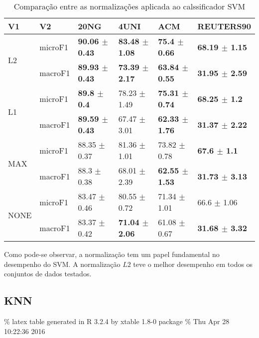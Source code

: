\documentclass[]{article}
\begin{document}
\begin{table}[ht]
\centering
\begin{tabular}{llllll}
  \hline
V1 & V2 & 20NG & 4UNI & ACM & REUTERS90 \\ 
  \cline{3-6} \hline
\multirow{2}{*}{L2} & microF1 & \bf{90.06 $\pm$  0.43} & \bf{83.48 $\pm$  1.08} & \bf{75.4 $\pm$  0.66} & \bf{68.19 $\pm$  1.15} \\ 
   & macroF1 & \bf{89.93 $\pm$  0.43} & \bf{73.39 $\pm$  2.17} & \bf{63.84 $\pm$  0.55} & \bf{31.95 $\pm$  2.59} \\ 
   \cline{3-6}\multirow{2}{*}{L1} & microF1 & \bf{89.8 $\pm$  0.4} & 78.23 $\pm$  1.49 & \bf{75.31 $\pm$  0.74} & \bf{68.25 $\pm$  1.2} \\ 
   & macroF1 & \bf{89.59 $\pm$  0.43} & 67.47 $\pm$  3.01 & \bf{62.33 $\pm$  1.76} & \bf{31.37 $\pm$  2.22} \\ 
   \cline{3-6}\multirow{2}{*}{MAX} & microF1 & 88.35 $\pm$  0.37 & 81.36 $\pm$  1.01 & 73.82 $\pm$  0.78 & \bf{67.6 $\pm$  1.1} \\ 
   & macroF1 & 88.3 $\pm$  0.38 & 68.01 $\pm$  2.39 & \bf{62.55 $\pm$  1.53} & \bf{31.73 $\pm$  3.13} \\ 
   \cline{3-6}\multirow{2}{*}{NONE} & microF1 & 83.47 $\pm$  0.46 & 80.55 $\pm$  0.72 & 71.34 $\pm$  1.01 & 66.6 $\pm$  1.06 \\ 
   & macroF1 & 83.37 $\pm$  0.42 & \bf{71.04 $\pm$  2.06} & 61.08 $\pm$  0.67 & \bf{31.68 $\pm$  3.32} \\ 
   \cline{3-6}\end{tabular}
\caption{Comparação entre as normalizações aplicada ao calssificador SVM} 
\end{table}

Como pode-se observar, a normalização tem um papel fundamental no
desempenho do SVM. A normalização \(L2\) teve o melhor desempenho em
todos os conjuntos de dados testados.

\subsection{KNN}\label{knn}

\% latex table generated in R 3.2.4 by xtable 1.8-0 package \% Thu Apr
28 10:22:36 2016
\end{document}
